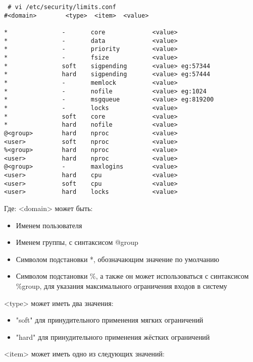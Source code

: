 \documentclass[a4paper,10pt,twoside]{article}
\begin{document}
\begin{verbatim}
 # vi /etc/security/limits.conf
#<domain>        <type>  <item>  <value>

*               -       core             <value>
*               -       data             <value>
*               -       priority         <value>
*               -       fsize            <value>
*               soft    sigpending       <value> eg:57344
*               hard    sigpending       <value> eg:57444
*               -       memlock          <value>
*               -       nofile           <value> eg:1024
*               -       msgqueue         <value> eg:819200
*               -       locks            <value>
*               soft    core             <value>
*               hard    nofile           <value>
@<group>        hard    nproc            <value>
<user>          soft    nproc            <value>
%<group>        hard    nproc            <value>
<user>          hard    nproc            <value>
@<group>        -       maxlogins        <value>
<user>          hard    cpu              <value>
<user>          soft    cpu              <value>
<user>          hard    locks            <value>
\end{verbatim} 


Где:
<domain> может быть:

\begin{itemize}
 \item Именем пользователя
\item Именем группы, с синтаксисом @group
\item Символом подстановки *, обозначающим значение по умолчанию
\item Символом подстановки \%, а также он может использоваться с синтаксисом \%group, для указания максимального ограничения входов в систему
\end{itemize}



<type> может иметь два значения:

\begin{itemize}
\item "soft" для принудительного применения мягких ограничений
\item "hard" для принудительного применения жёстких ограничений
\end{itemize}



<item> может иметь одно из следующих значений:
\end{document}
